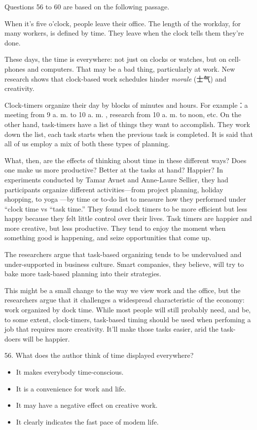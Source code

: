 \documentclass[UTF8,11pt]{ctexart}
\begin{document}
Questions 56 to 60 are based on the following passage.


When it’s five o’clock, people leave their office. The length of the workday, for many workers, is defined by time. They leave when the clock tells them they’re done.


These days, the time is everywhere: not just on clocks or watches, but on cell-phones and computers. That may be a bad thing, particularly at work. New research shows that clock-based work schedules hinder\textit{ morale} (士气) and creativity.


Clock-timers organize their day by blocks of minutes and hours. For example：a meeting from 9 a. m. to 10 a. m. , research from 10 a. m. to noon, etc. On the other hand, task-timers have a list of things they want to accomplish. They work down the list, each task starts when the previous task is completed. It is said that all of us employ a mix of both these types of planning.


What, then, are the effects of thinking about time in these different ways? Does one make us more productive? Better at the tasks at hand? Happier? In experiments conducted by Tamar Avnet and Anne-Laure Sellier, they had participants organize different activities—from project planning, holiday shopping, to yoga —by time or to-do list to measure how they performed under “clock time vs “task time.” They found clock timers to be more efficient but less happy because they felt little control over their lives. Task timers are happier and more creative, but less productive. They tend to enjoy the moment when something good is happening, and seize opportunities that come up.


The researchers argue that task-based organizing tends to be undervalued and under-supported in business culture. Smart companies, they believe, will try to bake more task-based planning into their strategies.


This might be a small change to the way we view work and the office, but the researchers argue that it challenges a widespread characteristic of the economy: work organized by dock time. While most people will still probably need, and be, to some extent, clock-timers, task-based timing should be used when perfoming a job that requires more creativity. It’ll make those tasks easier, arid the task- doers will be happier.


56. What does the author think of time displayed everywhere?


\begin{itemize}[leftmargin=2em,itemsep=.2em,topsep=.4em]\item[A.] It makes everybody time-conscious.
\item[B.] It is a convenience for work and life.
\item[C.] It may have a negative effect on creative work.
\item[D.] It clearly indicates the fast pace of modem life.
\end{itemize}
\end{document}
